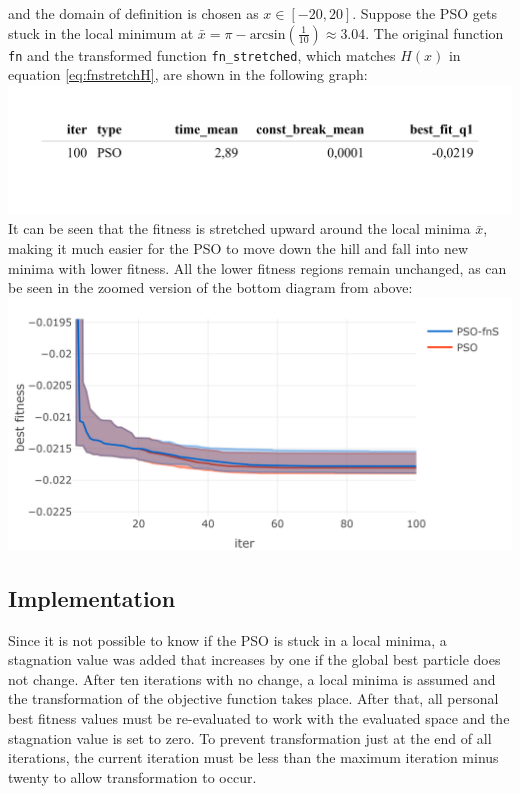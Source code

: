 \documentclass[
  oneside]{book}
\begin{document}
and the domain of definition is chosen as \(x \in [-20, 20]\). Suppose the PSO gets stuck in the local minimum at \(\bar{x} = \pi - \text{arcsin}(\frac{1}{10}) \approx 3.04\). The original function \texttt{fn} and the transformed function \texttt{fn\_stretched}, which matches \(H(x)\) in equation \eqref{eq:fnstretchH}, are shown in the following graph:\\
\includegraphics{Master_Thesis_files/figure-latex/unnamed-chunk-9-1.png}
It can be seen that the fitness is stretched upward around the local minima \(\bar{x}\), making it much easier for the PSO to move down the hill and fall into new minima with lower fitness. All the lower fitness regions remain unchanged, as can be seen in the zoomed version of the bottom diagram from above:
\includegraphics{Master_Thesis_files/figure-latex/unnamed-chunk-10-1.png}

\hypertarget{implementation}{%
\subsection{Implementation}\label{implementation}}

Since it is not possible to know if the PSO is stuck in a local minima, a stagnation value was added that increases by one if the global best particle does not change. After ten iterations with no change, a local minima is assumed and the transformation of the objective function takes place. After that, all personal best fitness values must be re-evaluated to work with the evaluated space and the stagnation value is set to zero. To prevent transformation just at the end of all iterations, the current iteration must be less than the maximum iteration minus twenty to allow transformation to occur.
\end{document}
